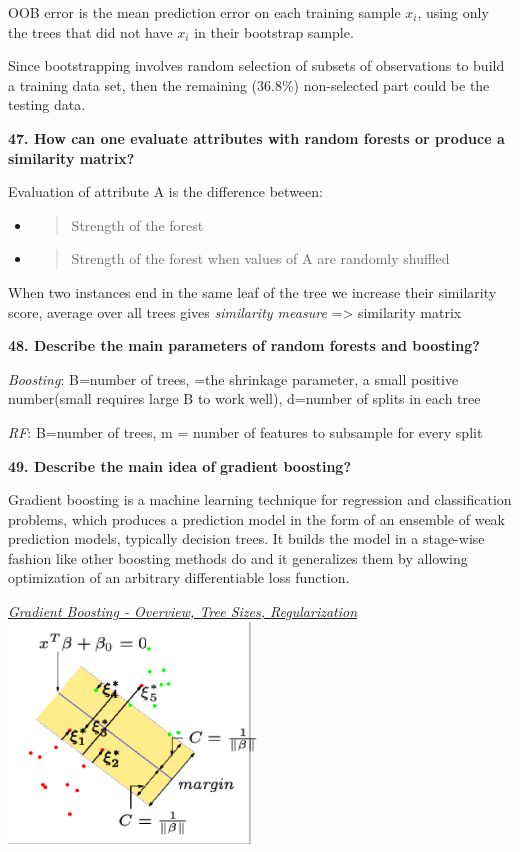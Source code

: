 OOB error is the mean prediction error on each training sample $x_i$, using
only the trees that did not have $x_i$ in their bootstrap sample.

Since bootstrapping involves random selection of subsets of observations
to build a training data set, then the remaining (36.8\%) non-selected
part could be the testing data.

\textbf{47. How can one evaluate attributes with random forests or
produce a similarity matrix?}

Evaluation of attribute A is the difference between:

\begin{itemize}
\item
  \begin{quote}
  Strength of the forest
  \end{quote}
\item
  \begin{quote}
  Strength of the forest when values of A are randomly shuffled
  \end{quote}
\end{itemize}

When two instances end in the same leaf of the tree we increase their
similarity score, average over all trees gives \emph{similarity measure}
=\textgreater{} similarity matrix

\textbf{48. Describe the main parameters of random forests and
boosting?}

\textit{Boosting}: B=number of trees, \textcrlambda=the shrinkage parameter, a
small positive number(small \textcrlambda requires large B to work well), d=number
of splits in each tree

\textit{RF}: B=number of trees, m = number of features to subsample
for every split

\textbf{49. Describe the main idea of} \textbf{gradient boosting?}

Gradient boosting is a machine learning technique for regression and
classification problems, which produces a prediction model in the form
of an ensemble of weak prediction models, typically decision trees. It
builds the model in a stage-wise fashion like other boosting methods do
and it generalizes them by allowing optimization of an arbitrary
differentiable loss function.

\href{https://corporatefinanceinstitute.com/resources/knowledge/other/gradient-boosting/}{\textit{Gradient
Boosting - Overview, Tree Sizes,
Regularization}}\includegraphics[width=2.60938in,height=2.32109in]{media/image33.png}

